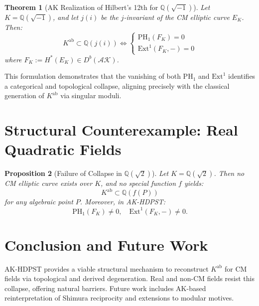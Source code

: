\documentclass[11pt]{article}
\newtheorem{theorem}{Theorem}[section]
\newtheorem{proposition}[theorem]{Proposition}
\begin{document}
\begin{theorem}[AK Realization of Hilbert's 12th for \( \mathbb{Q}(\sqrt{-1}) \)]
Let \( K = \mathbb{Q}(\sqrt{-1}) \), and let \( j(i) \) be the \( j \)-invariant of the CM elliptic curve \( E_K \). Then:
\[
  K^{\mathrm{ab}} \subset \mathbb{Q}(j(i)) \Longleftrightarrow
  \begin{cases}
    \mathrm{PH}_1(F_K) = 0 \\
    \mathrm{Ext}^1(F_K, -) = 0
  \end{cases}
\]
where \( F_K := H^*(E_K) \in D^b(\mathcal{AK}) \).
\end{theorem}

\begin{remark}
This formulation demonstrates that the vanishing of both \( \mathrm{PH}_1 \) and \( \mathrm{Ext}^1 \) identifies a categorical and topological collapse, aligning precisely with the classical generation of \( K^{\mathrm{ab}} \) via singular moduli.
\end{remark}

\section{Structural Counterexample: Real Quadratic Fields}
\begin{proposition}[Failure of Collapse in \( \mathbb{Q}(\sqrt{2}) \)]
Let \( K = \mathbb{Q}(\sqrt{2}) \). Then no CM elliptic curve exists over \( K \), and no special function \( f \) yields:
\[
  K^{\mathrm{ab}} \subset \mathbb{Q}(f(P))
\]
for any algebraic point \( P \). Moreover, in AK-HDPST:
\[
  \mathrm{PH}_1(F_K) \not= 0, \quad \mathrm{Ext}^1(F_K, -) \not= 0.
\]
\end{proposition}

\section{Conclusion and Future Work}
AK-HDPST provides a viable structural mechanism to reconstruct \( K^{\mathrm{ab}} \) for CM fields via topological and derived degeneration. Real and non-CM fields resist this collapse, offering natural barriers. Future work includes AK-based reinterpretation of Shimura reciprocity and extensions to modular motives.
\end{document}
